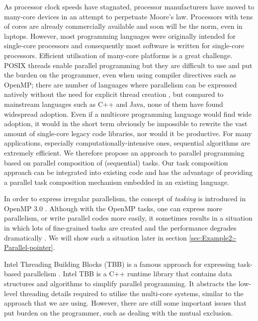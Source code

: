 \documentclass[copyright,creativecommons]{eptcs}
\begin{document}
As processor clock speeds have stagnated, processor manufacturers
have moved to many-core devices in an attempt to perpetuate Moore's
law. Processors with tens of cores are already commercially available
and soon will be the norm, even in laptops. However, most programming
languages were originally intended for single-core processors and
consequently most software is written for single-core processors.
Efficient utilisation of many-core platforms is a great challenge.
POSIX threads enable parallel programming but they are difficult to
use and put the burden on the programmer, even when using compiler
directives such as OpenMP; there are number of languages where parallelism
can be expressed natively without the need for explicit thread creation
\cite{weiland2007chapel,thies2002streamit,Armstrong2007PES,pointon2001design},
but compared to mainstream languages such as C++ and Java, none of
them have found widespread adoption. Even if a multicore programming
language would find wide adoption, it would in the short term obviously
be impossible to rewrite the vast amount of single-core legacy code
libraries, nor would it be productive. For many applications, especially
computationally-intensive ones, sequential algorithms are extremely
efficient. We therefore propose an approach to parallel programming
based on parallel composition of (sequential) tasks. Our task composition
approach can be integrated into existing code and has the advantage
of providing a parallel task composition mechanism embedded in an
existing language.

In order to express irregular parallelism, the concept of \textit{tasking}
is introduced in OpenMP 3.0 \cite{ayguade2009design}. Although with
the OpenMP tasks, one can express more parallelism, or write parallel
codes more easily, it sometimes results in a situation in which lots
of fine-grained tasks are created and the performance degrades dramatically
\cite{podobas2010comparison}. We will show such a situation later
in section \ref{sec:Example2:-Parallel-pointer}. 

Intel Threading Building Blocks (TBB) is a famous approach for expressing
task-based parallelism \cite{reinders2010intel}. Intel TBB is a C++
runtime library that contains data structures and algorithms to simplify
parallel programming. It abstracts the low-level threading details
required to utilise the multi-core systems, similar to the approach
that we are using. However, there are still some important issues
that put burden on the programmer, such as dealing with the mutual
exclusion. 
\end{document}
